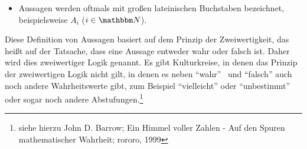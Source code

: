 \begin{Unit}
\begin{itemize}
\item Aussagen werden oftmals mit großen lateinischen Buchstaben bezeichnet,
  beispielsweise $A_i$ ($i \in \NN$). 

\end{itemize}

Diese Definition von Aussagen basiert auf dem Prinzip der Zweiwertigkeit, das 
heißt auf der Tatsache, dass eine Aussage entweder wahr oder falsch ist. 
Daher wird dies zweiwertiger Logik genannt. Es gibt Kulturkreise, in denen 
das Prinzip der zweiwertigen Logik nicht gilt, in denen es neben \enquote{wahr}
\ und \enquote{falsch} auch noch andere Wahrheitswerte gibt, zum Beispiel
\enquote{vielleicht} oder \enquote{unbestimmt} oder sogar noch andere 
Abstufungen.\footnote{siehe hierzu John D. Barrow; Ein Himmel voller Zahlen 
- Auf den Spuren mathematischer Wahrheit; rororo, 1999} 
\end{Unit}

